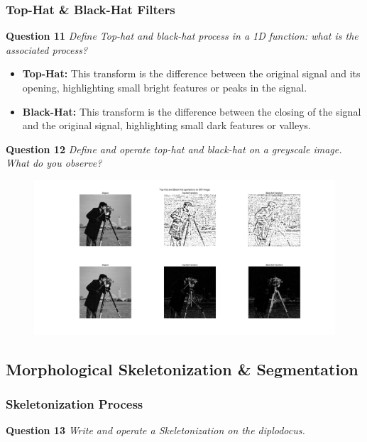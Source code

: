\newpage
\subsubsection{Top-Hat \& Black-Hat Filters}
\textbf{Question 11} \textit{Deﬁne Top-hat and black-hat process in a 1D function: what is the associated process?}

\begin{itemize}
    \item \textbf{Top-Hat:} This transform is the difference between the original signal and its opening, highlighting small bright features or peaks in the signal.

    \item \textbf{Black-Hat:} This transform is the difference between the closing of the signal and the original signal, highlighting small dark features or valleys.
\end{itemize}


\textbf{Question 12} \textit{Deﬁne and operate top-hat and black-hat on a greyscale image. What do you observe?}


\begin{figure}[H]
    \centering
    \includegraphics[width=1\linewidth]{Doc/Graphics/Part2/Q12.png}
\end{figure}

\newpage
\subsection{Morphological Skeletonization \& Segmentation}
\subsubsection{Skeletonization Process}
\textbf{Question 13} \textit{Write and operate a Skeletonization on the diplodocus.}

